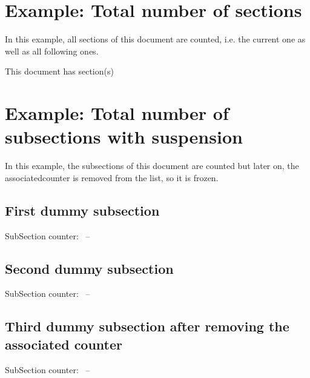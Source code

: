 \documentclass[12pt,paper=a4]{article}
\begin{document}
\appendix\label{examplesappendix}



\section[Total number of sections]{Example: Total number of sections}
In this example, all sections of this document are counted, i.e. the current one as well as all following ones.
\begin{dispExample}
This document has  section(s)%
\end{dispExample}



\section[Subsection with suspension]{Example: Total number of subsections with suspension}

In this example, the subsections of this document are counted but later on, the associatedcounter is removed from the list, so it is frozen.



\begin{dispExample}
%
%
%

\subsection{First dummy subsection}
SubSection counter: \thesubsection~-- \number{}
\subsection{Second dummy subsection}
SubSection counter: \thesubsection~-- \number{}

%
\subsection{Third dummy subsection after removing the associated counter}

SubSection counter: \thesubsection~-- \number{}

\end{dispExample}
\end{document}

